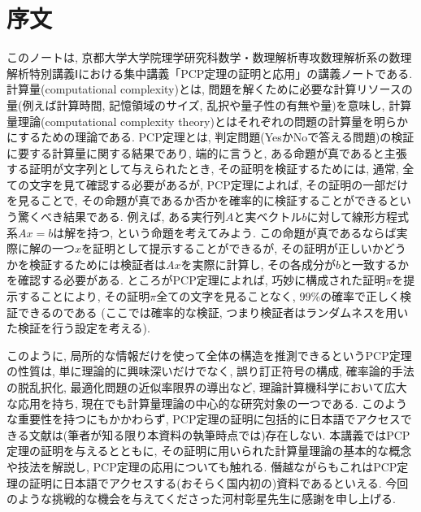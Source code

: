 \chapter*{序文}



このノートは, 京都大学大学院理学研究科数学・数理解析専攻数理解析系の数理解析特別講義Ⅰにおける集中講義「PCP定理の証明と応用」の講義ノートである.
計算量(computational complexity)とは, 問題を解くために必要な計算リソースの量(例えば計算時間, 記憶領域のサイズ, 乱択や量子性の有無や量)を意味し, 計算量理論(computational complexity theory)とはそれぞれの問題の計算量を明らかにするための理論である.
PCP定理とは, 判定問題(YesかNoで答える問題)の検証に要する計算量に関する結果であり,
端的に言うと, ある命題が真であると主張する証明が文字列として与えられたとき,
その証明を検証するためには, 通常, 全ての文字を見て確認する必要があるが,
PCP定理によれば, その証明の一部だけを見ることで, その命題が真であるか否かを確率的に検証することができるという驚くべき結果である.
例えば, ある実行列$A$と実ベクトル$b$に対して線形方程式系$Ax=b$は解を持つ, という命題を考えてみよう.
この命題が真であるならば実際に解の一つ$x$を証明として提示することができるが, その証明が正しいかどうかを検証するためには検証者は$Ax$を実際に計算し, その各成分が$b$と一致するかを確認する必要がある.
ところがPCP定理によれば, 巧妙に構成された証明$\pi$を提示することにより, その証明$\pi$全ての文字を見ることなく, 99\%の確率で正しく検証できるのである (ここでは確率的な検証, つまり検証者はランダムネスを用いた検証を行う設定を考える).

このように, 局所的な情報だけを使って全体の構造を推測できるというPCP定理の性質は, 単に理論的に興味深いだけでなく, 誤り訂正符号の構成, 確率論的手法の脱乱択化, 最適化問題の近似率限界の導出など, 理論計算機科学において広大な応用を持ち, 現在でも計算量理論の中心的な研究対象の一つである.
このような重要性を持つにもかかわらず, PCP定理の証明に包括的に日本語でアクセスできる文献は(筆者が知る限り本資料の執筆時点では)存在しない.
本講義ではPCP定理の証明を与えるとともに, その証明に用いられた計算量理論の基本的な概念や技法を解説し,
PCP定理の応用についても触れる.
僭越ながらもこれはPCP定理の証明に日本語でアクセスする(おそらく国内初の)資料であるといえる.
今回のような挑戦的な機会を与えてくださった河村彰星先生に感謝を申し上げる.
